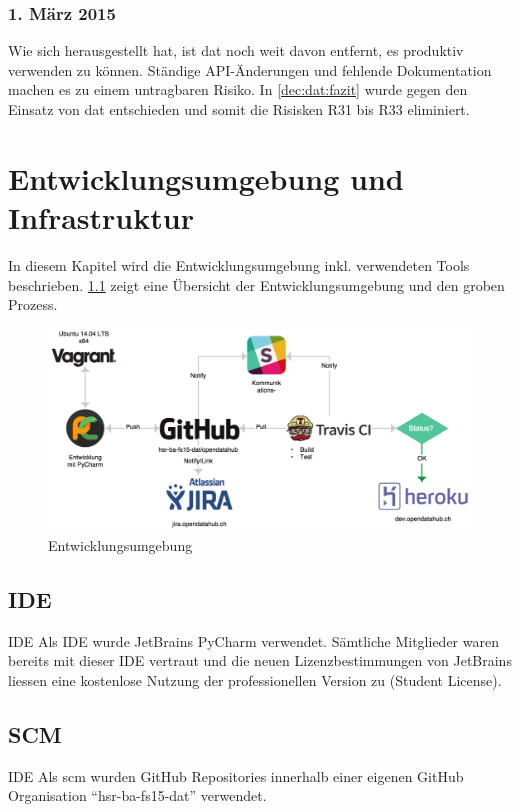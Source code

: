 \subsection{1. März 2015}

Wie sich herausgestellt hat, ist \gls{dat} noch weit davon entfernt, es produktiv verwenden zu können. Ständige API-Änderungen und fehlende Dokumentation machen es zu einem untragbaren Risiko. In \vref{dec:dat:fazit} wurde gegen den Einsatz von \gls{dat} entschieden und somit die Risisken R31 bis R33 eliminiert.

\chapter{Entwicklungsumgebung und Infrastruktur}
In diesem Kapitel wird die Entwicklungsumgebung inkl. verwendeten Tools beschrieben. \cref{fig:pm:entwicklungsumgebung} zeigt eine Übersicht der Entwicklungsumgebung und den groben Prozess.

\begin{figure}[H]
	\centering
	\includegraphics[width=\linewidth]{fig/entwicklungsumgebung}
	\caption{Entwicklungsumgebung}
	\label{fig:pm:entwicklungsumgebung}
\end{figure}

\section{IDE}
\begin{decision}{IDE}
	Als IDE wurde JetBrains PyCharm verwendet. Sämtliche Mitglieder waren bereits mit dieser IDE vertraut und die neuen Lizenzbestimmungen von JetBrains liessen eine kostenlose Nutzung der professionellen Version zu (Student License).
\end{decision}
\section{SCM}
\begin{decision}{IDE}
Als \gls{scm} wurden GitHub Repositories innerhalb einer eigenen GitHub Organisation ``hsr-ba-fs15-dat'' verwendet.
\end{decision}

